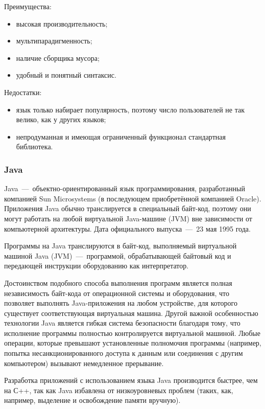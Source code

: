 Преимущества:
\begin{itemize}
	\item высокая производительность;
	\item мультипарадигменность;
	\item наличие сборщика мусора;
	\item удобный и понятный синтаксис.
\end{itemize}

Недостатки:
\begin{itemize}
	\item язык только набирает популярность, поэтому число пользователей не так велико, как у других языков;
	\item непродуманная и имеющая ограниченный функционал стандартная библиотека.~\cite{WikiD}
\end{itemize}

\subsubsection{Java}
Java~---~объектно-ориентированный язык программирования, разработанный компанией Sun Microsystems (в последующем приобретённой компанией Oracle). Приложения Java обычно транслируется в специальный байт-код, поэтому они могут работать на любой виртуальной Java-машине (JVM) вне зависимости от компьютерной архитектуры. Дата официального выпуска~---~23 мая 1995 года.

Программы на Java транслируются в байт-код, выполняемый виртуальной машиной Java (JVM)~---~программой, обрабатывающей байтовый код и передающей инструкции оборудованию как интерпретатор.

Достоинством подобного способа выполнения программ является полная независимость байт-кода от операционной системы и оборудования, что позволяет выполнять Java-приложения на любом устройстве, для которого существует соответствующая виртуальная машина. Другой важной особенностью технологии Java является гибкая система безопасности благодаря тому, что исполнение программы полностью контролируется виртуальной машиной. Любые операции, которые превышают установленные полномочия программы (например, попытка несанкционированного доступа к данным или соединения с другим компьютером) вызывают немедленное прерывание.

Разработка приложений с использованием языка Java производится быстрее, чем на С++, так как Java избавлена от низкоуровневых проблем (таких, как, например, выделение и освобождение памяти вручную).

